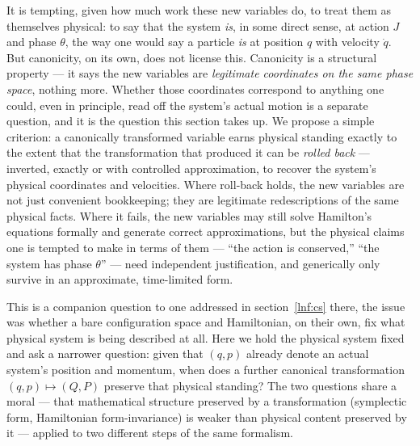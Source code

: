 It is tempting, given how much work these new variables do, to treat them as
themselves physical: to say that the system \emph{is}, in some direct sense, at
action $J$ and phase $\theta$, the way one would say a particle \emph{is} at
position $q$ with velocity $\dot q$. But canonicity, on its own, does not
license this. Canonicity is a structural property --- it says the new variables
are \emph{legitimate coordinates on the same phase space}, nothing more.
Whether those coordinates correspond to anything one could, even in principle,
read off the system's actual motion is a separate question, and it is the
question this section takes up. We propose a simple criterion: a canonically
transformed variable earns physical standing exactly to the extent that the
transformation that produced it can be \emph{rolled back} --- inverted, exactly
or with controlled approximation, to recover the system's physical coordinates
and velocities. Where roll-back holds, the new variables are not just
convenient bookkeeping; they are legitimate redescriptions of the same physical
facts. Where it fails, the new variables may still solve Hamilton's equations
formally and generate correct approximations, but the physical claims one is
tempted to make in terms of them --- ``the action is conserved,'' ``the system
has phase $\theta$'' --- need independent justification, and generically only
survive in an approximate, time-limited form.

This is a companion question to one addressed in section~\ref{lnf:cs} 
there, the issue was
whether a bare configuration space and Hamiltonian, on their own, fix what
physical system is being described at all.
 Here we hold the physical system fixed and ask
a narrower question: given that $(q,p)$ already denote an actual system's
position and momentum, when does a further canonical transformation
$(q,p)\mapsto(Q,P)$ preserve that physical standing? The two questions share a
moral --- that mathematical structure preserved by a transformation (symplectic
form, Hamiltonian form-invariance) is weaker than physical content preserved by
it --- applied to two different steps of the same formalism.


